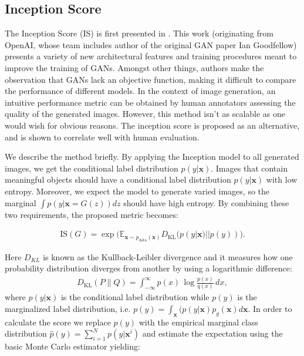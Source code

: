 \subsection{Inception Score}
The Inception Score (IS) is first presented in \cite{salimans2016improved}. This work (originating from OpenAI, whose team includes author of the original GAN paper Ian Goodfellow) presents a variety of new architectural features and training procedures meant to improve the training of GANs. Amongst other things, authors make the observation that GANs lack an objective function, making it difficult to compare the performance of different models. In the context of image generation, an intuitive performance metric can be obtained by human annotators assessing the quality of the generated images. However, this method isn't as scalable as one would wish for obvious reasons. The inception score is proposed as an alternative, and is shown to correlate well with human evaluation. 

We describe the method briefly. By applying the Inception model \cite{inceptionv2} to all generated images, we get the conditional label distribution $p(y|\bm{x})$. Images that contain meaningful objects should have a conditional label distribution $p(y|\bm{x})$ with low entropy. Moreover, we expect the model to generate varied images, so the marginal $\int p(y|\bm{x} = G(z))dz$ should have high entropy. By combining these two requirements, the proposed metric becomes: 

\begin{equation}
\label{eq_IS}
\begin{split}
\text{IS}(G) = \exp \big(\mathbb{E}_{\bm{x} \sim p_{\text{data}}(\bm{x})}D_\text{KL}(p(y|\bm{x})||p(y))\big).
\end{split}
\end{equation}

Here $D_{KL}$ is known as the Kullback-Leibler divergence and it measures how one probability distribution diverges from another by using a logarithmic difference:
\begin{eqnarray}
	D_{\mathrm {KL} }(P\|Q)=\int _{-\infty }^{\infty }p(x)\,\log {\frac {p(x)}{q(x)}}\,dx,
\end{eqnarray}
where $p(y|\bm{x})$ is the conditional label distribution while $p(y)$ is the  marginalized label distribution, i.e. $p(y)=\int_{\bm{x}} (p(y|\bm{x})p_g(\bm{x}) d\bm{x}$. In order to calculate the score we replace $p(y)$ with the empirical marginal class distribution $\hat{p}(y) = \sum^N_{i=1} p(y|\bm{x}^i)$ and estimate the expectation using the basic Monte Carlo estimator yielding:

